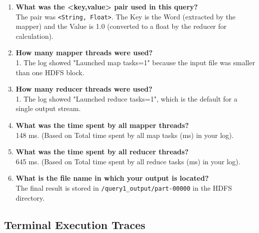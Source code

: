 \documentclass{article}
\begin{document}
\begin{enumerate}
    \item \textbf{What was the <key,value> pair used in this query?} \\
    The pair was \texttt{<String, Float>}. The Key is the Word (extracted by the mapper) and the Value is 1.0 (converted to a float by the reducer for calculation).
    \item \textbf{How many mapper threads were used?} \\
    1. The log showed "Launched map tasks=1" because the input file was smaller than one HDFS block.
    \item \textbf{How many reducer threads were used?} \\
    1. The log showed "Launched reduce tasks=1", which is the default for a single output stream.
    \item \textbf{What was the time spent by all mapper threads?} \\
    148 ms. (Based on Total time spent by all map tasks (ms) in your log).
    \item \textbf{What was the time spent by all reducer threads?} \\
    645 ms. (Based on Total time spent by all reduce tasks (ms) in your log).
    \item \textbf{What is the file name in which your output is located?} \\
    The final result is stored in \texttt{/query1\_output/part-00000} in the HDFS directory.
\end{enumerate}

\subsection*{Terminal Execution Traces}
\end{document}
